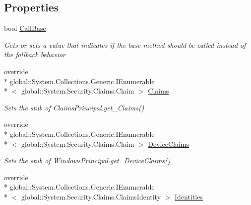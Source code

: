 \subsection*{Properties}
\begin{DoxyCompactItemize}
\item 
bool \hyperlink{class_system_1_1_security_1_1_principal_1_1_fakes_1_1_stub_windows_principal_a709d89091d03e9764b2882aabbfb5960}{Call\-Base}
\begin{DoxyCompactList}\small\item\em Gets or sets a value that indicates if the base method should be called instead of the fallback behavior\end{DoxyCompactList}\item 
override \\*
global\-::\-System.\-Collections.\-Generic.\-I\-Enumerable\\*
$<$ global\-::\-System.\-Security.\-Claims.\-Claim $>$ \hyperlink{class_system_1_1_security_1_1_principal_1_1_fakes_1_1_stub_windows_principal_a62d758e5a69fc40068225ea3ad52383e}{Claims}
\begin{DoxyCompactList}\small\item\em Sets the stub of Claims\-Principal.\-get\-\_\-\-Claims()\end{DoxyCompactList}\item 
override \\*
global\-::\-System.\-Collections.\-Generic.\-I\-Enumerable\\*
$<$ global\-::\-System.\-Security.\-Claims.\-Claim $>$ \hyperlink{class_system_1_1_security_1_1_principal_1_1_fakes_1_1_stub_windows_principal_a0d4613e0a0d07f1b72a5f11f62d4fe0f}{Device\-Claims}
\begin{DoxyCompactList}\small\item\em Sets the stub of Windows\-Principal.\-get\-\_\-\-Device\-Claims()\end{DoxyCompactList}\item 
override \\*
global\-::\-System.\-Collections.\-Generic.\-I\-Enumerable\\*
$<$ global\-::\-System.\-Security.\-Claims.\-Claims\-Identity $>$ \hyperlink{class_system_1_1_security_1_1_principal_1_1_fakes_1_1_stub_windows_principal_a8eae4075a00aa90bf53e587d2d396c92}{Identities}

\end{DoxyCompactItemize}

